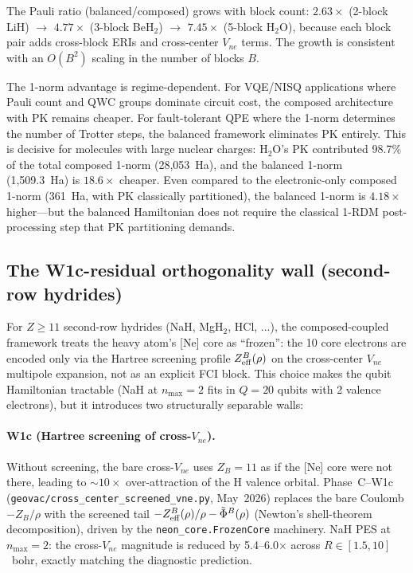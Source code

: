 \documentclass[aps,pra,twocolumn,superscriptaddress,longbibliography]{revtex4-2}
\begin{document}
The Pauli ratio (balanced/composed) grows with block count:
$2.63\times$ (2-block LiH) $\to$ $4.77\times$ (3-block BeH$_2$)
$\to$ $7.45\times$ (5-block H$_2$O), because each block pair adds
cross-block ERIs and cross-center $V_{ne}$ terms.  The growth is
consistent with an $O(B^2)$ scaling in the number of blocks $B$.

The 1-norm advantage is regime-dependent.  For VQE/NISQ applications
where Pauli count and QWC groups dominate circuit cost, the composed
architecture with PK remains cheaper.  For fault-tolerant QPE where
the 1-norm determines the number of Trotter steps, the balanced
framework eliminates PK entirely.  This is decisive for molecules
with large nuclear charges: H$_2$O's PK contributed 98.7\% of the
total composed 1-norm (28,053~Ha), and the balanced 1-norm
(1,509.3~Ha) is $18.6\times$ cheaper.  Even compared to the
electronic-only composed 1-norm (361~Ha, with PK classically
partitioned), the balanced 1-norm is $4.18\times$ higher---but the
balanced Hamiltonian does not require the classical 1-RDM post-processing
step that PK partitioning demands.


\subsection{The W1c-residual orthogonality wall (second-row hydrides)}
\label{sec:w1c_residual}

For $Z \geq 11$ second-row hydrides (NaH, MgH$_2$, HCl, ...), the
composed-coupled framework treats the heavy atom's [Ne] core as
``frozen'': the 10 core electrons are encoded only via the Hartree
screening profile $Z_{\rm eff}^B(\rho)$ on the cross-center
$V_{ne}$ multipole expansion, not as an explicit FCI block. This
choice makes the qubit Hamiltonian tractable (NaH at $n_{\max} = 2$
fits in $Q = 20$ qubits with 2 valence electrons), but it
introduces two structurally separable walls:

\paragraph{W1c (Hartree screening of cross-$V_{ne}$).}
Without screening, the bare cross-$V_{ne}$ uses $Z_B = 11$ as if the
[Ne] core were not there, leading to ${\sim}10\times$ over-attraction
of the H valence orbital. Phase~C--W1c
(\texttt{geovac/cross\_center\_screened\_vne.py}, May~2026) replaces
the bare Coulomb $-Z_B/\rho$ with the screened tail
$-Z_{\rm eff}^B(\rho)/\rho - \tilde\Phi^B(\rho)$ (Newton's
shell-theorem decomposition), driven by the
\texttt{neon\_core.FrozenCore} machinery. NaH PES at $n_{\max} = 2$:
the cross-$V_{ne}$ magnitude is reduced by 5.4--6.0$\times$ across
$R \in [1.5, 10]$~bohr, exactly matching the diagnostic prediction.
\end{document}
